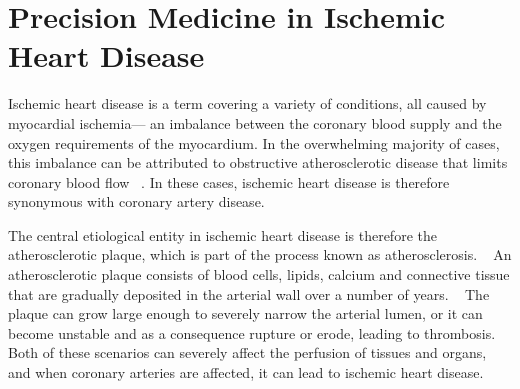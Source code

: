 \chapter{Precision Medicine in Ischemic Heart Disease}
\label{chap:precision-medicine}

Ischemic heart disease is a term covering a variety of conditions, 
all caused by myocardial ischemia---%
an imbalance between the coronary blood supply and the 
oxygen requirements of the myocardium.
In the overwhelming majority of cases, 
this imbalance can be attributed to obstructive atherosclerotic disease 
that limits coronary blood flow
~\autocite{kumarRobbins2014}.
In these cases, ischemic heart disease is therefore synonymous 
with coronary artery disease.

The central etiological entity in ischemic heart disease
is therefore the atherosclerotic plaque, 
which is part of the process known as atherosclerosis. 
~\autocite{kumarRobbins2014}
An atherosclerotic plaque consists of blood cells, lipids, calcium 
and connective tissue that are gradually deposited in the arterial wall 
over a number of years.
~\autocite{libbyPathophysiology2005}
The plaque can grow large enough to severely narrow the arterial lumen,
or it can become unstable and as a consequence rupture or erode,
leading to thrombosis.%
Both of these scenarios can severely affect 
the perfusion of tissues and organs, 
and when coronary arteries are affected,
it can lead to ischemic heart disease.


